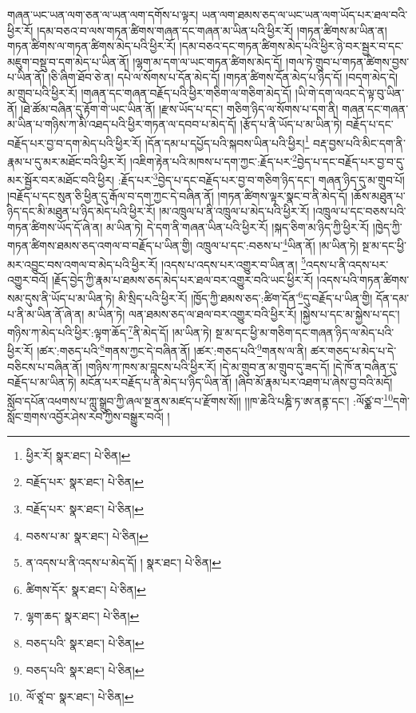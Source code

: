 གཞན་ཡང་ཡན་ལག་ཅན་ལ་ཡན་ལག་དགོས་པ་ལྟར། ཡན་ལག་ཐམས་ཅད་ལ་ཡང་ཡན་ལག་ཡོད་པར་ཐལ་བའི་ཕྱིར་རོ། །དམ་བཅའ་བ་ལས་གཏན་ཚིགས་གཞན་དང་གཞན་མ་ཡིན་པའི་ཕྱིར་རོ། །གཏན་ཚིགས་མ་ཡིན་ན། གཏན་ཚིགས་ལ་གཏན་ཚིགས་མེད་པའི་ཕྱིར་རོ། །དམ་བཅའ་དང་གཏན་ཚིགས་མེད་པའི་ཕྱིར་ཉེ་བར་སྦྱར་བ་དང་མཇུག་བསྡུ་བ་དག་མེད་པ་ཡིན་ནོ། །ལྷག་མ་དག་ལ་ཡང་གཏན་ཚིགས་མེད་དོ། །གལ་ཏེ་གྲུབ་པ་གཏན་ཚིགས་བྱས་པ་ཡིན་ནོ། །ཅི་ཞིག་ཐོབ་ཅེ་ན། དཔེ་ལ་སོགས་པ་དོན་མེད་དོ། །གཏན་ཚིགས་དོན་མེད་པ་ཉིད་དོ། །བདག་མེད་དེ། མ་གྲུབ་པའི་ཕྱིར་རོ། །གཞན་དང་གཞན་བརྗོད་པའི་ཕྱིར་གཅིག་ལ་གཅིག་མེད་དོ། །ཡི་གེ་དག་ལའང་དེ་ལྟ་བུ་ཡིན་ནོ། །ཐེ་ཚོམ་བཞིན་དུ་རྟོག་གེ་ཡང་ཡིན་ནོ། །རྫས་ཡོད་པ་དང་། གཅིག་ཉིད་ལ་སོགས་པ་དག་ནི། གཞན་དང་གཞན་མ་ཡིན་པ་གཉིས་ཀ་མི་འཐད་པའི་ཕྱིར་གཏན་ལ་དབབ་པ་མེད་དོ། །རྩོད་པ་ནི་ཡོད་པ་མ་ཡིན་ཏེ། བརྗོད་པ་དང་བརྗོད་པར་བྱ་བ་དག་མེད་པའི་ཕྱིར་རོ། །དོན་དམ་པ་དཔྱོད་པའི་སྐབས་ཡིན་པའི་ཕྱིར།\footnote{ཕྱིར་རོ།  སྣར་ཐང་།  པེ་ཅིན། } བརྡ་བྱས་པའི་མིང་དག་ནི་རྣམ་པ་དུ་མར་མཐོང་བའི་ཕྱིར་རོ། །འཇིག་རྟེན་པའི་མཁས་པ་དག་ཀྱང་:རྗོད་པར་\footnote{བརྗོད་པར་  སྣར་ཐང་།  པེ་ཅིན། }བྱེད་པ་དང་བརྗོད་པར་བྱ་བ་དུ་མར་སྦྱོར་བར་མཐོང་བའི་ཕྱིར། :རྗོད་པར་\footnote{བརྗོད་པར་  སྣར་ཐང་།  པེ་ཅིན། }བྱེད་པ་དང་བརྗོད་པར་བྱ་བ་གཅིག་ཉིད་དང་། གཞན་ཉིད་དུ་མ་གྲུབ་པོ། །བརྗོད་པ་དང་སུན་ཅི་ཕྱིན་དུ་རྒོལ་བ་དག་ཀྱང་དེ་བཞིན་ནོ། །གཏན་ཚིགས་ལྟར་སྣང་བ་ནི་མེད་དོ། །ཆོས་མཐུན་པ་ཉིད་དང་མི་མཐུན་པ་ཉིད་མེད་པའི་ཕྱིར་རོ། །མ་འཁྲུལ་པ་ནི་འཁྲུལ་པ་མེད་པའི་ཕྱིར་རོ། །འཁྲུལ་པ་དང་བཅས་པའི་གཏན་ཚིགས་ཡོད་དོ་ཞེ་ན། མ་ཡིན་ཏེ། དེ་དག་ནི་གཞན་ཡིན་པའི་ཕྱིར་རོ། །སྐད་ཅིག་མ་ཉིད་ཀྱི་ཕྱིར་རོ། །ཁྱེད་ཀྱི་གཏན་ཚིགས་ཐམས་ཅད་འགལ་བ་བརྗོད་པ་ཡིན་གྱི། འཁྲུལ་པ་དང་:བཅས་པ་\footnote{བཅས་པ་མ་  སྣར་ཐང་།  པེ་ཅིན། }ཡིན་ནོ། །མ་ཡིན་ཏེ། སྔ་མ་དང་ཕྱི་མར་འབྱུང་བས་འགལ་བ་མེད་པའི་ཕྱིར་རོ། །འདས་པ་འདས་པར་འགྱུར་བ་ཡིན་ན། \footnote{ན་འདས་པ་ནི་འདས་པ་མེད་དོ། །   སྣར་ཐང་།  པེ་ཅིན། }འདས་པ་ནི་འདས་པར་འགྱུར་བའོ། །རྗོད་བྱེད་ཀྱི་རྣམ་པ་ཐམས་ཅད་མེད་པར་ཐལ་བར་འགྱུར་བའི་ཡང་ཕྱིར་རོ། །འདས་པའི་གཏན་ཚིགས་སམ་དུས་ནི་ཡོད་པ་མ་ཡིན་ཏེ། མི་སྲིད་པའི་ཕྱིར་རོ། །ཁྱོད་ཀྱི་ཐམས་ཅད་:ཚིག་དོན་\footnote{ཚིགས་དོར་  སྣར་ཐང་།  པེ་ཅིན། }དུ་བརྗོད་པ་ཡིན་གྱི། དོན་དམ་པ་ནི་མ་ཡིན་ནོ་ཞེ་ན། མ་ཡིན་ཏེ། ལན་ཐམས་ཅད་ལ་ཐལ་བར་འགྱུར་བའི་ཕྱིར་རོ། །སྐྱེས་པ་དང་མ་སྐྱེས་པ་དང་། གཉིས་ཀ་མེད་པའི་ཕྱིར་:ལྟག་ཆོད་\footnote{ལྷག་ཆད་  སྣར་ཐང་།  པེ་ཅིན། }ནི་མེད་དོ། །མ་ཡིན་ཏེ། སྔ་མ་དང་ཕྱི་མ་གཅིག་དང་གཞན་ཉིད་ལ་མེད་པའི་ཕྱིར་རོ། །ཚར་:གཅད་པའི་\footnote{བཅད་པའི་  སྣར་ཐང་།  པེ་ཅིན། }གནས་ཀྱང་དེ་བཞིན་ནོ། །ཚར་:གཅད་པའི་\footnote{བཅད་པའི་  སྣར་ཐང་།  པེ་ཅིན། }གནས་ལ་ནི། ཚར་གཅད་པ་མེད་པ་དེ་བཅིངས་པ་བཞིན་ནོ། །གཉིས་ཀ་ཁས་མ་བླངས་པའི་ཕྱིར་རོ། །དེ་མ་གྲུབ་ན་མ་གྲུབ་དུ་ཟད་དོ། །དེ་ཁོ་ན་བཞིན་དུ་བརྗོད་པ་མ་ཡིན་ཏེ། མངོན་པར་བརྗོད་པ་ནི་མེད་པ་ཉིད་ཡིན་ནོ། །ཞིབ་མོ་རྣམ་པར་འཐག་པ་ཞེས་བྱ་བའི་མདོ། སློབ་དཔོན་འཕགས་པ་ཀླུ་སྒྲུབ་ཀྱི་ཞལ་སྔ་ནས་མཛད་པ་རྫོགས་སོ།། །།ཁ་ཆེའི་པཎྜི་ཏ་ཨ་ནནྟ་དང་། :ལོཙྪ་བ་\footnote{ལོ་ཙཱ་བ་  སྣར་ཐང་།  པེ་ཅིན། }དགེ་སློང་གྲགས་འབྱོར་ཤེས་རབ་ཀྱིས་བསྒྱུར་བའོ། ། 